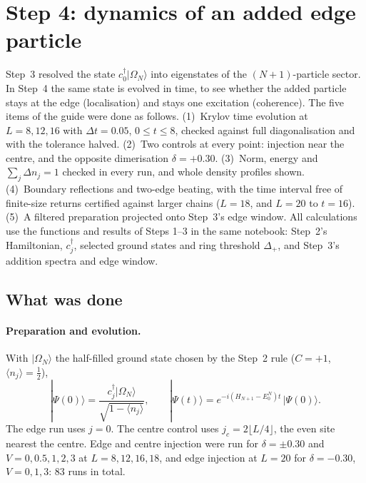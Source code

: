 \documentclass[11pt,a4paper]{article}
\newcommand{\dg}{^{\dagger}}
\begin{document}
\section{Step 4: dynamics of an added edge particle}
\label{sec:step4}

Step~3 resolved the state $c_0\dg|\Omega_N\rangle$ into eigenstates of the $(N+1)$-particle sector. In Step~4 the same state is evolved in time, to see whether the added particle stays at the edge (localisation) and stays one excitation (coherence). The five items of the guide were done as follows. (1)~Krylov time evolution at $L=8,12,16$ with $\Delta t=0.05$, $0\le t\le 8$, checked against full diagonalisation and with the tolerance halved. (2)~Two controls at every point: injection near the centre, and the opposite dimerisation $\delta=+0.30$. (3)~Norm, energy and $\sum_j\Delta n_j=1$ checked in every run, and whole density profiles shown. (4)~Boundary reflections and two-edge beating, with the time interval free of finite-size returns certified against larger chains ($L=18$, and $L=20$ to $t=16$). (5)~A filtered preparation projected onto Step~3's edge window. All calculations use the functions and results of Steps 1--3 in the same notebook: Step~2's Hamiltonian, $c_j\dg$, selected ground states and ring threshold $\Delta_+$, and Step~3's addition spectra and edge window.

\subsection{What was done}

\paragraph{Preparation and evolution.} With $|\Omega_N\rangle$ the half-filled ground state chosen by the Step~2 rule ($C=+1$, $\langle n_j\rangle=\tfrac12$),
\begin{equation}
|\Psi(0)\rangle=\frac{c_j\dg|\Omega_N\rangle}{\sqrt{1-\langle n_j\rangle}},\qquad
|\Psi(t)\rangle=e^{-i(H_{N+1}-E_0^N)t}\,|\Psi(0)\rangle .
\label{eq:step4prep}
\end{equation}
The edge run uses $j=0$. The centre control uses $j_c=2\lfloor L/4\rfloor$, the even site nearest the centre. Edge and centre injection were run for $\delta=\pm0.30$ and $V=0,0.5,1,2,3$ at $L=8,12,16,18$, and edge injection at $L=20$ for $\delta=-0.30$, $V=0,1,3$: 83 runs in total.
\end{document}

